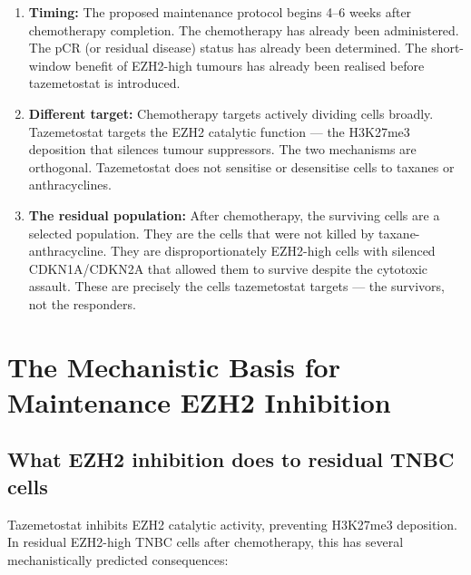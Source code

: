 \documentclass[12pt, a4paper]{article}
\begin{document}
\begin{enumerate}
  \item \textbf{Timing:} The proposed maintenance
        protocol begins 4--6 weeks after
        chemotherapy completion. The chemotherapy
        has already been administered. The pCR (or
        residual disease) status has already been
        determined. The short-window benefit of
        EZH2-high tumours has already been realised
        before tazemetostat is introduced.

  \item \textbf{Different target:} Chemotherapy
        targets actively dividing cells broadly.
        Tazemetostat targets the EZH2 catalytic
        function --- the H3K27me3 deposition that
        silences tumour suppressors. The two
        mechanisms are orthogonal. Tazemetostat
        does not sensitise or desensitise cells
        to taxanes or anthracyclines.

  \item \textbf{The residual population:} After
        chemotherapy, the surviving cells are a
        selected population. They are the cells
        that were not killed by taxane-anthracycline.
        They are disproportionately EZH2-high cells
        with silenced CDKN1A/CDKN2A that allowed
        them to survive despite the cytotoxic
        assault. These are precisely the cells
        tazemetostat targets --- the survivors,
        not the responders.
\end{enumerate}

\section{The Mechanistic Basis for Maintenance EZH2
Inhibition}

\subsection{What EZH2 inhibition does to residual
TNBC cells}

Tazemetostat inhibits EZH2 catalytic activity,
preventing H3K27me3 deposition. In residual EZH2-high
TNBC cells after chemotherapy, this has several
mechanistically predicted consequences:
\end{document}
